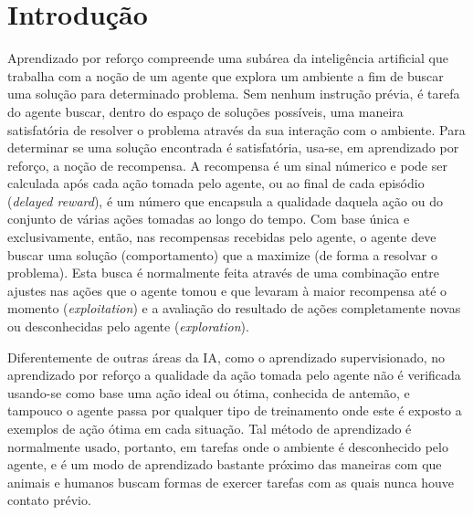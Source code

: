 \documentclass[cic,tc]{iiufrgs}
\begin{document}

\tableofcontents

\chapter{Introdução}
Aprendizado por reforço compreende uma subárea da inteligência artificial que
trabalha com a noção de um agente que explora um ambiente a fim de buscar uma
solução para determinado problema. Sem nenhum instrução prévia,
é tarefa do agente buscar, dentro do espaço de soluções possíveis, uma maneira
satisfatória de resolver o problema através da sua interação com o ambiente.
Para determinar se uma solução encontrada é satisfatória, usa-se, em aprendizado
por reforço, a noção de recompensa. A recompensa é um sinal númerico e pode ser
calculada após cada ação tomada pelo agente, ou ao final de cada episódio
(\textit{delayed reward}), é um número que encapsula a qualidade daquela ação ou
 do conjunto de várias ações tomadas ao longo do tempo. Com base única e
exclusivamente, então, nas recompensas recebidas pelo agente,
o agente deve buscar uma solução (comportamento) que a maximize (de forma a resolvar o problema). Esta busca  é normalmente feita através
de uma combinação entre ajustes nas ações que o agente tomou e que levaram à maior recompensa até o momento (\textit{exploitation}) e a avaliação do resultado de ações completamente
novas ou desconhecidas pelo agente (\textit{exploration}).


Diferentemente de outras áreas da IA, como o aprendizado supervisionado, no aprendizado por reforço a qualidade da ação tomada pelo agente não
é verificada usando-se como base uma ação ideal ou ótima,  conhecida de antemão, e tampouco o agente passa por qualquer tipo de treinamento onde este é exposto a
exemplos de ação ótima em cada situação. Tal método de aprendizado é normalmente usado, portanto, em tarefas onde o ambiente é desconhecido
pelo agente, e é um modo de aprendizado bastante próximo das maneiras com que
animais e humanos buscam formas de exercer tarefas com as quais nunca houve contato prévio.
\end{document}

